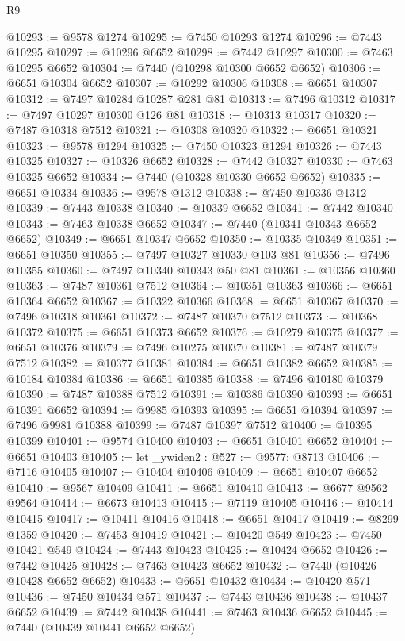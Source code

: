 \begin{lexlean}{R9}
\begin{coremodule}
@10293 := @9578 @1274
@10295 := @7450 @10293 @1274
@10296 := @7443 @10295
@10297 := @10296 @6652
@10298 := @7442 @10297
@10300 := @7463 @10295 @6652
@10304 := @7440 (@10298 @10300 @6652 @6652)
@10306 := @6651 @10304 @6652
@10307 := @10292 @10306
@10308 := @6651 @10307
@10312 := @7497 @10284 @10287 @281 @81
@10313 := @7496 @10312
@10317 := @7497 @10297 @10300 @126 @81
@10318 := @10313 @10317
@10320 := @7487 @10318 @7512
@10321 := @10308 @10320
@10322 := @6651 @10321
@10323 := @9578 @1294
@10325 := @7450 @10323 @1294
@10326 := @7443 @10325
@10327 := @10326 @6652
@10328 := @7442 @10327
@10330 := @7463 @10325 @6652
@10334 := @7440 (@10328 @10330 @6652 @6652)
@10335 := @6651 @10334
@10336 := @9578 @1312
@10338 := @7450 @10336 @1312
@10339 := @7443 @10338
@10340 := @10339 @6652
@10341 := @7442 @10340
@10343 := @7463 @10338 @6652
@10347 := @7440 (@10341 @10343 @6652 @6652)
@10349 := @6651 @10347 @6652
@10350 := @10335 @10349
@10351 := @6651 @10350
@10355 := @7497 @10327 @10330 @103 @81
@10356 := @7496 @10355
@10360 := @7497 @10340 @10343 @50 @81
@10361 := @10356 @10360
@10363 := @7487 @10361 @7512
@10364 := @10351 @10363
@10366 := @6651 @10364 @6652
@10367 := @10322 @10366
@10368 := @6651 @10367
@10370 := @7496 @10318 @10361
@10372 := @7487 @10370 @7512
@10373 := @10368 @10372
@10375 := @6651 @10373 @6652
@10376 := @10279 @10375
@10377 := @6651 @10376
@10379 := @7496 @10275 @10370
@10381 := @7487 @10379 @7512
@10382 := @10377 @10381
@10384 := @6651 @10382 @6652
@10385 := @10184 @10384
@10386 := @6651 @10385
@10388 := @7496 @10180 @10379
@10390 := @7487 @10388 @7512
@10391 := @10386 @10390
@10393 := @6651 @10391 @6652
@10394 := @9985 @10393
@10395 := @6651 @10394
@10397 := @7496 @9981 @10388
@10399 := @7487 @10397 @7512
@10400 := @10395 @10399
@10401 := @9574 @10400
@10403 := @6651 @10401 @6652
@10404 := @6651 @10403
@10405 := let _ywiden2 : @527 := @9577; @8713
@10406 := @7116 @10405
@10407 := @10404 @10406
@10409 := @6651 @10407 @6652
@10410 := @9567 @10409
@10411 := @6651 @10410
@10413 := @6677 @9562 @9564
@10414 := @6673 @10413
@10415 := @7119 @10405
@10416 := @10414 @10415
@10417 := @10411 @10416
@10418 := @6651 @10417
@10419 := @8299 @1359
@10420 := @7453 @10419
@10421 := @10420 @549
@10423 := @7450 @10421 @549
@10424 := @7443 @10423
@10425 := @10424 @6652
@10426 := @7442 @10425
@10428 := @7463 @10423 @6652
@10432 := @7440 (@10426 @10428 @6652 @6652)
@10433 := @6651 @10432
@10434 := @10420 @571
@10436 := @7450 @10434 @571
@10437 := @7443 @10436
@10438 := @10437 @6652
@10439 := @7442 @10438
@10441 := @7463 @10436 @6652
@10445 := @7440 (@10439 @10441 @6652 @6652)

\end{coremodule}
\end{lexlean}
